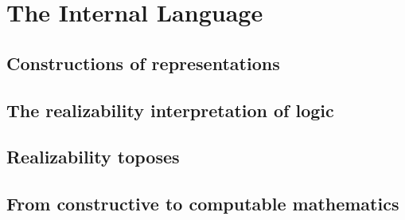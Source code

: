\chapter{The Internal Language}
\label{chap:internal-language}

\section{Constructions of representations}
\label{sec:constructions}

\section{The realizability interpretation of logic}
\label{sec:realizability-interpretation}

\section{Realizability toposes}
\label{sec:realizability-toposes}

\section{From constructive to computable mathematics}
\label{sec:constructive-math}



